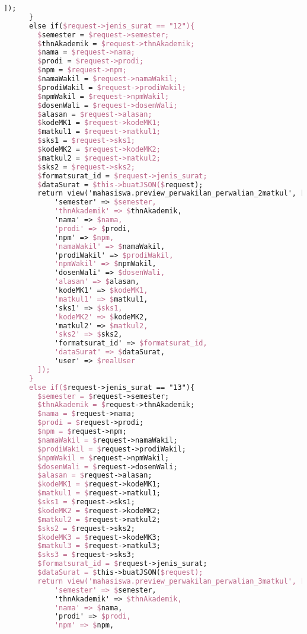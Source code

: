 \begin{lstlisting}[language=tex,basicstyle=\tiny,caption=PesanansuratController.php]
        ]);
      }
      else if($request->jenis_surat == "12"){
        $semester = $request->semester;
        $thnAkademik = $request->thnAkademik;
        $nama = $request->nama;
        $prodi = $request->prodi;
        $npm = $request->npm;
        $namaWakil = $request->namaWakil;
        $prodiWakil = $request->prodiWakil;
        $npmWakil = $request->npmWakil;
        $dosenWali = $request->dosenWali;
        $alasan = $request->alasan;
        $kodeMK1 = $request->kodeMK1;
        $matkul1 = $request->matkul1;
        $sks1 = $request->sks1;
        $kodeMK2 = $request->kodeMK2;
        $matkul2 = $request->matkul2;
        $sks2 = $request->sks2;
        $formatsurat_id = $request->jenis_surat;
        $dataSurat = $this->buatJSON($request);
        return view('mahasiswa.preview_perwakilan_perwalian_2matkul', [
            'semester' => $semester,
            'thnAkademik' => $thnAkademik,
            'nama' => $nama,
            'prodi' => $prodi,
            'npm' => $npm,
            'namaWakil' => $namaWakil,
            'prodiWakil' => $prodiWakil,
            'npmWakil' => $npmWakil,
            'dosenWali' => $dosenWali,
            'alasan' => $alasan,
            'kodeMK1' => $kodeMK1,
            'matkul1' => $matkul1,
            'sks1' => $sks1,
            'kodeMK2' => $kodeMK2,
            'matkul2' => $matkul2,
            'sks2' => $sks2,
            'formatsurat_id' => $formatsurat_id,
            'dataSurat' => $dataSurat,
            'user' => $realUser
        ]);
      }
      else if($request->jenis_surat == "13"){
        $semester = $request->semester;
        $thnAkademik = $request->thnAkademik;
        $nama = $request->nama;
        $prodi = $request->prodi;
        $npm = $request->npm;
        $namaWakil = $request->namaWakil;
        $prodiWakil = $request->prodiWakil;
        $npmWakil = $request->npmWakil;
        $dosenWali = $request->dosenWali;
        $alasan = $request->alasan;
        $kodeMK1 = $request->kodeMK1;
        $matkul1 = $request->matkul1;
        $sks1 = $request->sks1;
        $kodeMK2 = $request->kodeMK2;
        $matkul2 = $request->matkul2;
        $sks2 = $request->sks2;
        $kodeMK3 = $request->kodeMK3;
        $matkul3 = $request->matkul3;
        $sks3 = $request->sks3;
        $formatsurat_id = $request->jenis_surat;
        $dataSurat = $this->buatJSON($request);
        return view('mahasiswa.preview_perwakilan_perwalian_3matkul', [
            'semester' => $semester,
            'thnAkademik' => $thnAkademik,
            'nama' => $nama,
            'prodi' => $prodi,
            'npm' => $npm,

\end{lstlisting}
